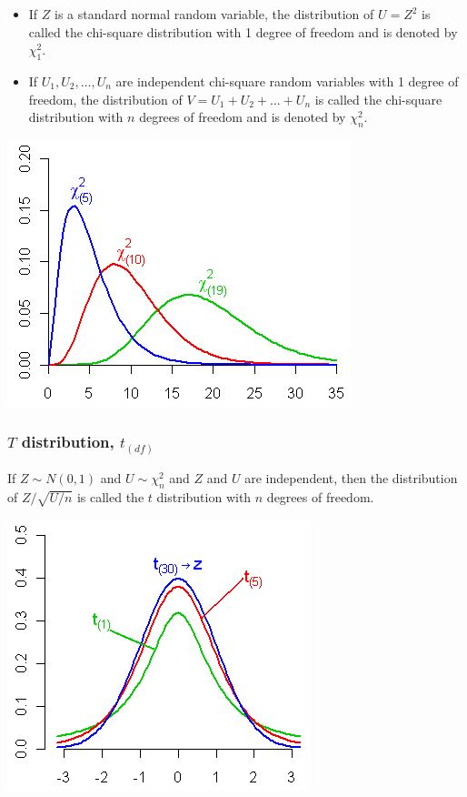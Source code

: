 \documentclass[
]{article}
\providecommand{\tightlist}{%
  \setlength{\itemsep}{0pt}\setlength{\parskip}{0pt}}
\begin{document}
\begin{itemize}
\tightlist
\item
  If \(Z\) is a standard normal random variable, the distribution of
  \(U=Z^2\) is called the chi-square distribution with 1 degree of
  freedom and is denoted by \(\chi^2_1\).
\item
  If \(U_1, U_2,\ldots, U_n\) are independent chi-square random
  variables with 1 degree of freedom, the distribution of
  \(V=U_1+ U_2+\ldots+ U_n\) is called the chi-square distribution with
  \(n\) degrees of freedom and is denoted by \(\chi^2_n\).
\end{itemize}

\begin{center}\includegraphics[width=0.8\linewidth,height=0.8\textheight]{chidist} \end{center}

\hypertarget{t-distribution-t_df}{%
\subsubsection{\texorpdfstring{\(T\) distribution,
\(t_{(df)}\)}{T distribution, t\_\{(df)\}}}\label{t-distribution-t_df}}

If \(Z \sim N(0,1)\) and \(U \sim \chi^2_n\) and \(Z\) and \(U\) are
independent, then the distribution of \(Z/\sqrt{U/n}\) is called the
\(t\) distribution with \(n\) degrees of freedom.

\begin{center}\includegraphics[width=0.8\linewidth,height=0.8\textheight]{tdist} \end{center}
\end{document}
